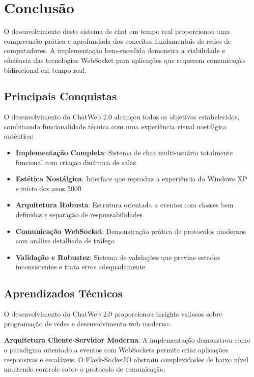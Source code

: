 \documentclass[conference,compsoc]{IEEEtran}
\begin{document}
\begin{otherlanguage}{brazil}
\section{Conclusão}

O desenvolvimento deste sistema de chat em tempo real proporcionou uma compreensão prática e aprofundada dos conceitos fundamentais de redes de computadores. A implementação bem-sucedida demonstra a viabilidade e eficiência das tecnologias WebSocket para aplicações que requerem comunicação bidirecional em tempo real.

\subsection{Principais Conquistas}

O desenvolvimento do ChatWeb 2.0 alcançou todos os objetivos estabelecidos, combinando funcionalidade técnica com uma experiência visual nostálgica autêntica:

\begin{itemize}
\item \textbf{Implementação Completa}: Sistema de chat multi-usuário totalmente funcional com criação dinâmica de salas
\item \textbf{Estética Nostálgica}: Interface que reproduz a experiência do Windows XP e início dos anos 2000
\item \textbf{Arquitetura Robusta}: Estrutura orientada a eventos com classes bem definidas e separação de responsabilidades
\item \textbf{Comunicação WebSocket}: Demonstração prática de protocolos modernos com análise detalhada de tráfego
\item \textbf{Validação e Robustez}: Sistema de validações que previne estados inconsistentes e trata erros adequadamente
\end{itemize}

\subsection{Aprendizados Técnicos}

O desenvolvimento do ChatWeb 2.0 proporcionou insights valiosos sobre programação de redes e desenvolvimento web moderno:

\textbf{Arquitetura Cliente-Servidor Moderna}: A implementação demonstrou como o paradigma orientado a eventos com WebSockets permite criar aplicações responsivas e escaláveis. O Flask-SocketIO abstraiu complexidades de baixo nível mantendo controle sobre o protocolo de comunicação.


\end{otherlanguage}
\end{document}
